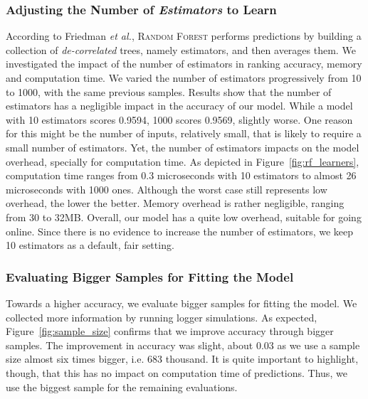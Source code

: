 \subsubsection{Adjusting the Number of \emph{Estimators} to Learn}

According to Friedman \emph{et al.}, \textsc{Random Forest} performs predictions by building a collection of \emph{de-correlated} trees, namely estimators, and then averages them. We investigated the impact of the number of estimators in ranking accuracy, memory and computation time. We varied the number of estimators progressively from 10 to 1000, with the same previous samples. Results show that the number of estimators has a negligible impact in the accuracy of our model. While a model with 10 estimators scores 0.9594, 1000 scores 0.9569, slightly worse. One reason for this might be the number of inputs, relatively small, that is likely to require a small number of estimators. Yet, the number of estimators impacts on the model overhead, specially for computation time. As depicted in Figure~\ref{fig:rf_learners}, computation time ranges from 0.3 microseconds with 10 estimators to almost 26 microseconds with 1000 ones. Although the worst case still represents low overhead, the lower the better. Memory overhead is rather negligible, ranging from 30 to 32MB. Overall, our model has a quite low overhead, suitable for going online. Since there is no evidence to increase the number of estimators, we keep 10 estimators as a default, fair setting.

\subsubsection{Evaluating Bigger Samples for Fitting the Model}

Towards a higher accuracy, we evaluate bigger samples for fitting the model. We collected more information by running logger simulations. As expected, Figure~\ref{fig:sample_size} confirms that we improve accuracy through bigger samples. The improvement in accuracy was slight, about 0.03 as we use a sample size almost six times bigger, i.e. 683 thousand. It is quite important to highlight, though, that this has no impact on computation time of predictions. Thus, we use the biggest sample for the remaining evaluations.

